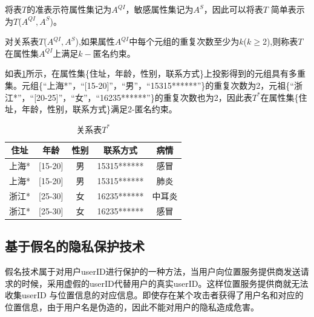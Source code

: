 将表$T$的准表示符属性集记为$A^{QI}$，敏感属性集记为$A^S$，因此可以将表$T$ 简单表示为$T$($A^{QI},A^S$)。

\begin{define}[k-匿名约束]
对关系表$T$($A^{QI},A^S$),如果属性$A^{QI}$中每个元组的重复次数至少为$k$($k\geq$2),则称表$T$在属性集$A^{QI}$上满足$k-$匿名约束。
\end{define}

如表\ref{k-anony-2}所示，在属性集\{住址，年龄，性别，联系方式\}上投影得到的元组具有多重集。元组\{“上海*”，“[15-20]”，“男”，“15315******”\}的重复次数为2，元祖\{“浙江*”，“[20-25]”，“女”，“16235******”\}的重复次数也为2，因此表$T^*$在属性集\{住址，年龄，性别，联系方式\}满足2-匿名约束。
\begin{table}[hbp]
\centering  %
\begin{tabular}{ccccc}  %
\hline
住址 &年龄&性别 &联系方式&病情\\ \hline  %
上海*&[15-20]&男 &15315****** &感冒\\         %
上海*&[15-20]&男 &15315****** &肺炎\\        %
浙江*&[25-30]&女 &16235****** &中耳炎\\
浙江*&[25-30]&女 &16235****** &感冒\\ \hline
\end{tabular}
\caption{关系表$T^*$}\label{k-anony-2}
\end{table}
\subsection{基于假名的隐私保护技术}
假名技术属于对用户userID进行保护的一种方法，当用户向位置服务提供商发送请求的时候，采用虚假的userID代替用户的真实userID。这样位置服务提供商就无法收集userID 与位置信息的对应信息。即使存在某个攻击者获得了用户名和对应的位置信息，由于用户名是伪造的，因此不能对用户的隐私造成危害。

